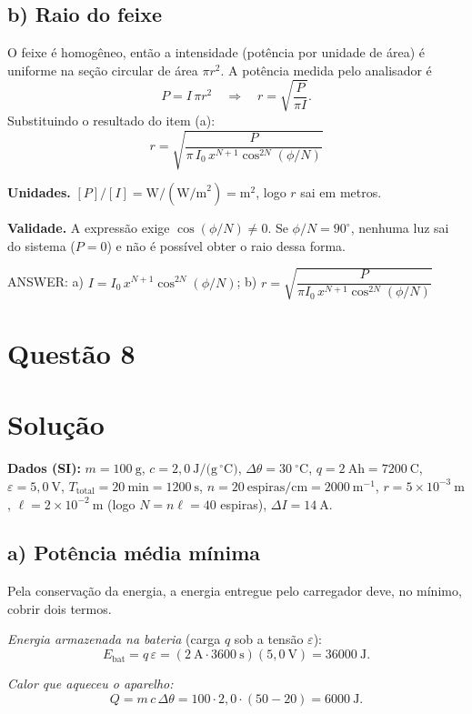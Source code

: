 \documentclass{article}%
\begin{document}
\subsection*{b) Raio do feixe}

O feixe é homogêneo, então a intensidade (potência por unidade de área) é uniforme na seção circular de área $\pi r^2$. A potência medida pelo analisador é
\[
P = I\,\pi r^2 \quad\Longrightarrow\quad r = \sqrt{\frac{P}{\pi I}} .
\]
Substituindo o resultado do item (a):
\[
\boxed{r = \sqrt{\dfrac{P}{\pi\,I_0\,x^{N+1}\cos^{2N}\!\left(\phi/N\right)}}}
\]

\textbf{Unidades.} $[P]/[I] = \text{W}/(\text{W/m}^2) = \text{m}^2$, logo $r$ sai em metros.

\textbf{Validade.} A expressão exige $\cos(\phi/N)\neq 0$. Se $\phi/N = 90^\circ$, nenhuma luz sai do sistema ($P=0$) e não é possível obter o raio dessa forma.

ANSWER: a) $I = I_0\,x^{N+1}\cos^{2N}(\phi/N)$; b) $r = \sqrt{\dfrac{P}{\pi I_0\,x^{N+1}\cos^{2N}(\phi/N)}}$%
\newpage%
\section*{Questão 8}

\section*{Solução}

\textbf{Dados (SI):} $m=100\ \text{g}$, $c=2{,}0\ \text{J/(g}\,^\circ\text{C)}$, $\Delta\theta=30\ ^\circ\text{C}$, $q=2\ \text{Ah}=7200\ \text{C}$, $\varepsilon=5{,}0\ \text{V}$, $T_{\text{total}}=20\ \text{min}=1200\ \text{s}$, $n=20\ \text{espiras/cm}=2000\ \text{m}^{-1}$, $r=5\times10^{-3}\ \text{m}$, $\ell=2\times10^{-2}\ \text{m}$ (logo $N=n\ell=40$ espiras), $\Delta I=14\ \text{A}$.

\subsection*{a) Potência média mínima}

Pela conservação da energia, a energia entregue pelo carregador deve, no mínimo, cobrir dois termos.

\emph{Energia armazenada na bateria} (carga $q$ sob a tensão $\varepsilon$):
\[
E_{\text{bat}}=q\,\varepsilon=(2\ \text{A}\cdot 3600\ \text{s})(5{,}0\ \text{V})=36000\ \text{J}.
\]

\emph{Calor que aqueceu o aparelho:}
\[
Q=m\,c\,\Delta\theta=100\cdot 2{,}0\cdot(50-20)=6000\ \text{J}.
\]
\end{document}
